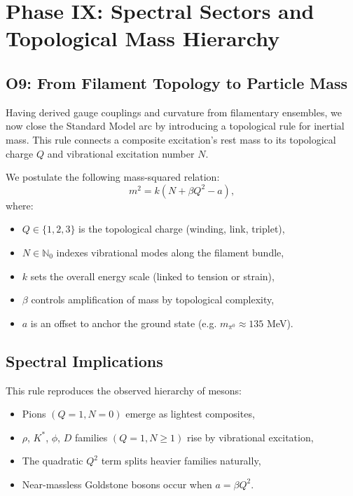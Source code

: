 
\section*{Phase IX: Spectral Sectors and Topological Mass Hierarchy}

\subsection*{O9: From Filament Topology to Particle Mass}

Having derived gauge couplings and curvature from filamentary ensembles, we now close the Standard Model arc by introducing a topological rule for inertial mass. This rule connects a composite excitation’s rest mass to its topological charge $Q$ and vibrational excitation number $N$.

We postulate the following mass-squared relation:
\begin{equation}
    m^2 = k \left( N + \beta Q^2 - a \right),
\end{equation}
where:
\begin{itemize}
    \item $Q \in \{1,2,3\}$ is the topological charge (winding, link, triplet),
    \item $N \in \mathbb{N}_0$ indexes vibrational modes along the filament bundle,
    \item $k$ sets the overall energy scale (linked to tension or strain),
    \item $\beta$ controls amplification of mass by topological complexity,
    \item $a$ is an offset to anchor the ground state (e.g. $m_{\pi^0} \approx 135$ MeV).
\end{itemize}

\subsection*{Spectral Implications}

This rule reproduces the observed hierarchy of mesons:
\begin{itemize}
    \item Pions $(Q=1, N=0)$ emerge as lightest composites,
    \item $\rho$, $K^*$, $\phi$, $D$ families $(Q=1, N \geq 1)$ rise by vibrational excitation,
    \item The quadratic $Q^2$ term splits heavier families naturally,
    \item Near-massless Goldstone bosons occur when $a = \beta Q^2$.
\end{itemize}

